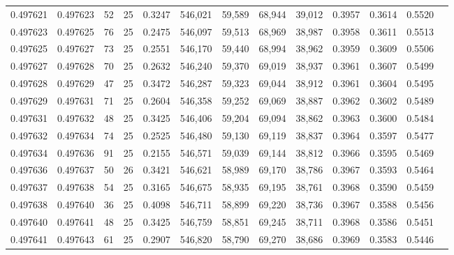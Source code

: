\begin{tabular}{rrrrrrrrrrrrr}
0.497621 & 0.497623 &    52 &  25 &                                     0.3247 & 546,021 &  59,589 &  68,944 &  39,012 & 0.3957 & 0.3614 & 0.5520 \\
0.497623 & 0.497625 &    76 &  25 &                                     0.2475 & 546,097 &  59,513 &  68,969 &  38,987 & 0.3958 & 0.3611 & 0.5513 \\
0.497625 & 0.497627 &    73 &  25 &                                     0.2551 & 546,170 &  59,440 &  68,994 &  38,962 & 0.3959 & 0.3609 & 0.5506 \\
0.497627 & 0.497628 &    70 &  25 &                                     0.2632 & 546,240 &  59,370 &  69,019 &  38,937 & 0.3961 & 0.3607 & 0.5499 \\
0.497628 & 0.497629 &    47 &  25 &                                     0.3472 & 546,287 &  59,323 &  69,044 &  38,912 & 0.3961 & 0.3604 & 0.5495 \\
0.497629 & 0.497631 &    71 &  25 &                                     0.2604 & 546,358 &  59,252 &  69,069 &  38,887 & 0.3962 & 0.3602 & 0.5489 \\
0.497631 & 0.497632 &    48 &  25 &                                     0.3425 & 546,406 &  59,204 &  69,094 &  38,862 & 0.3963 & 0.3600 & 0.5484 \\
0.497632 & 0.497634 &    74 &  25 &                                     0.2525 & 546,480 &  59,130 &  69,119 &  38,837 & 0.3964 & 0.3597 & 0.5477 \\
0.497634 & 0.497636 &    91 &  25 &                                     0.2155 & 546,571 &  59,039 &  69,144 &  38,812 & 0.3966 & 0.3595 & 0.5469 \\
0.497636 & 0.497637 &    50 &  26 &                                     0.3421 & 546,621 &  58,989 &  69,170 &  38,786 & 0.3967 & 0.3593 & 0.5464 \\
0.497637 & 0.497638 &    54 &  25 &                                     0.3165 & 546,675 &  58,935 &  69,195 &  38,761 & 0.3968 & 0.3590 & 0.5459 \\
0.497638 & 0.497640 &    36 &  25 &                                     0.4098 & 546,711 &  58,899 &  69,220 &  38,736 & 0.3967 & 0.3588 & 0.5456 \\
0.497640 & 0.497641 &    48 &  25 &                                     0.3425 & 546,759 &  58,851 &  69,245 &  38,711 & 0.3968 & 0.3586 & 0.5451 \\
0.497641 & 0.497643 &    61 &  25 &                                     0.2907 & 546,820 &  58,790 &  69,270 &  38,686 & 0.3969 & 0.3583 & 0.5446 \\

\end{tabular}
